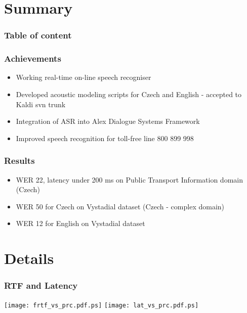 \section{Summary} %

\begin{frame} \frametitle{Table of content} \tableofcontents \end{frame}

\begin{frame}\frametitle{Achievements} 
    \begin{itemize}
        \item Working real-time on-line speech recogniser
        \item Developed acoustic modeling scripts for Czech and English - accepted to Kaldi svn trunk
        \item Integration of ASR into Alex Dialogue Systems Framework
        \item Improved speech recognition for toll-free line 800 899 998
    \end{itemize}
\end{frame}

\begin{frame}\frametitle{Results} 
    \begin{itemize}
        \item WER 22, latency under 200 ms on Public Transport Information domain (Czech)
        \item WER 50 for Czech on Vystadial dataset (Czech - complex domain)
        \item WER 12 for English on Vystadial dataset 
    \end{itemize}
\end{frame}


\section{Details} %

\begin{frame}\frametitle{RTF and Latency} 
    \texttt{[image: frtf\_vs\_prc.pdf.ps]}
    \texttt{[image: lat\_vs\_prc.pdf.ps]}
\end{frame}


